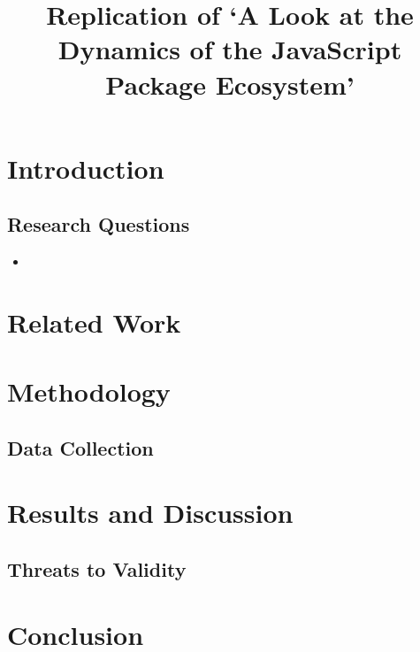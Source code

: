 \documentclass[10pt,conference]{IEEEtran}
\begin{document}
\title{Replication of ‘A Look at the Dynamics of the JavaScript Package Ecosystem’\\}

\author{
}


\maketitle

\begin{abstract}
  
\end{abstract}

\section{Introduction}


\subsection{Research Questions}
\begin{itemize}
  \item 

\end{itemize}



\section{Related Work}


\section{Methodology}


\subsection{Data Collection}

\section{Results and Discussion}


\subsection{Threats to Validity}



\section{Conclusion}


  


\vspace{12pt}
\end{document}
